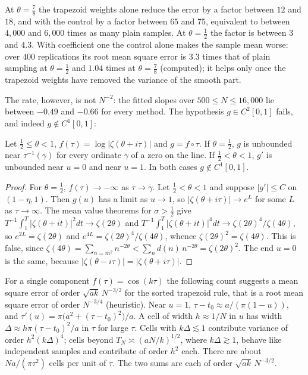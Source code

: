 At $\theta=\frac78$ the trapezoid weights alone reduce the error by a factor between $12$ and $18$, and with the control by a factor between $65$ and $75$, equivalent to between $4{,}000$ and $6{,}000$ times as many plain samples. At $\theta=\frac12$ the factor is between $3$ and $4.3$. With coefficient one the control alone makes the sample mean worse: over $400$ replications its root mean square error is $3.3$ times that of plain sampling at $\theta=\frac12$ and $1.04$ times at $\theta=\frac78$ (computed); it helps only once the trapezoid weights have removed the variance of the smooth part.

The rate, however, is not $N^{-2}$: the fitted slopes over $500\le N\le16{,}000$ lie between $-0.49$ and $-0.66$ for every method. The hypothesis $g\in C^2[0,1]$ fails, and indeed $g\notin C^1[0,1]$:

\begin{proposition}\label{bsy:prop:rate}
Let $\frac12\le\theta<1$, $f(\tau)=\log|\zeta(\theta+i\tau)|$ and $g=f\circ\tau$. If $\theta=\frac12$, $g$ is unbounded near $\tau^{-1}(\gamma)$ for every ordinate $\gamma$ of a zero on the line. If $\frac12<\theta<1$, $g'$ is unbounded near $u=0$ and near $u=1$. In both cases $g\notin C^1[0,1]$.
\end{proposition}

\begin{proof}
For $\theta=\frac12$, $f(\tau)\to-\infty$ as $\tau\to\gamma$. Let $\frac12<\theta<1$ and suppose $|g'|\le C$ on $(1-\eta,1)$. Then $g(u)$ has a limit as $u\to1$, so $|\zeta(\theta+i\tau)|\to e^L$ for some $L$ as $\tau\to\infty$. The mean value theorems for $\sigma>\frac12$ \cite[Chapter VII]{Titchmarsh} give $T^{-1}\int_1^T|\zeta(\theta+it)|^2dt\to\zeta(2\theta)$ and $T^{-1}\int_1^T|\zeta(\theta+it)|^4dt\to\zeta(2\theta)^4/\zeta(4\theta)$, so $e^{2L}=\zeta(2\theta)$ and $e^{4L}=\zeta(2\theta)^4/\zeta(4\theta)$, whence $\zeta(2\theta)^2=\zeta(4\theta)$. This is false, since $\zeta(4\theta)=\sum_{n=m^2}n^{-2\theta}<\sum_nd(n)\,n^{-2\theta}=\zeta(2\theta)^2$. The end $u=0$ is the same, because $|\zeta(\theta-i\tau)|=|\zeta(\theta+i\tau)|$.
\end{proof}

\begin{remark}
For a single component $f(\tau)=\cos(k\tau)$ the following count suggests a mean square error of order $\sqrt{ak}\,N^{-3/2}$ for the sorted trapezoid rule, that is a root mean square error of order $N^{-3/4}$ (heuristic). Near $u=1$, $\tau-t_0\approx a/(\pi(1-u))$, and $\tau'(u)=\pi\bigl(a^2+(\tau-t_0)^2\bigr)/a$. A cell of width $h\approx1/N$ in $u$ has width $\Delta\approx h\pi(\tau-t_0)^2/a$ in $\tau$ for large $\tau$. Cells with $k\Delta\lesssim1$ contribute variance of order $h^2(k\Delta)^4$; cells beyond $T_N\asymp(aN/k)^{1/2}$, where $k\Delta\gtrsim1$, behave like independent samples and contribute of order $h^2$ each. There are about $Na/(\pi\tau^2)$ cells per unit of $\tau$. The two sums are each of order $\sqrt{ak}\,N^{-3/2}$.
\end{remark}

